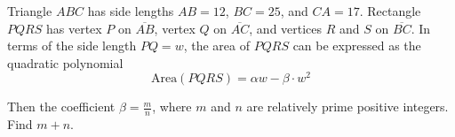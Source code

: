 Triangle $ABC$ has side lengths $AB=12$,  $BC=25$,  and $CA=17$. Rectangle $PQRS$ has vertex $P$ on $\overline{AB}$,  vertex $Q$ on $\overline{AC}$,  and vertices $R$ and $S$ on $\overline{BC}$. In terms of the side length $PQ=w$,  the area of $PQRS$ can be expressed as the quadratic polynomial\[\text{Area}(PQRS)=\alpha w-\beta\cdot w^2\]

Then the coefficient $\beta=\frac{m}{n}$,  where $m$ and $n$ are relatively prime positive integers. Find $m+n$.
